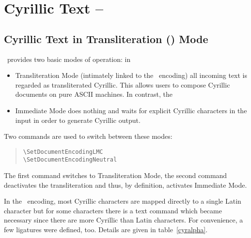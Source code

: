 \documentclass[11pt,a4paper]{article}
\begin{document}
\section{Cyrillic Text -- }

\subsection{Cyrillic Text in Transliteration (\LMC) Mode%
	\label{section:CyrillicTransliterationMode}}

\MonTeX\ provides two basic modes of operation: in
\begin{itemize}\label{SetDocumentEncoding}
	\item Transliteration Mode (intimately linked to the \LMC\
		encoding) all incoming text is regarded as
		transliterated Cyrillic. This allows users to
		compose Cyrillic documents on pure ASCII machines.
		In contrast, the
	\item Immediate Mode does nothing and waits for explicit
		Cyrillic characters in the input in order to generate
		Cyrillic output.
\end{itemize}
Two commands are used to switch between these modes:
\begin{quote}
\begin{verbatim}
\SetDocumentEncodingLMC
\SetDocumentEncodingNeutral
\end{verbatim}
\end{quote}

The first command switches to Transliteration Mode, the second
command deactivates the transliteration and thus, by definition,
activates Immediate Mode.

In the \LMC\ encoding, most Cyrillic characters are mapped directly to
a single Latin character but for some characters there is a text
command which became necessary since there are more Cyrillic than
Latin characters. For convenience, a few ligatures were defined, too.
Details are given in table~\ref{cyralpha}.
\end{document}
